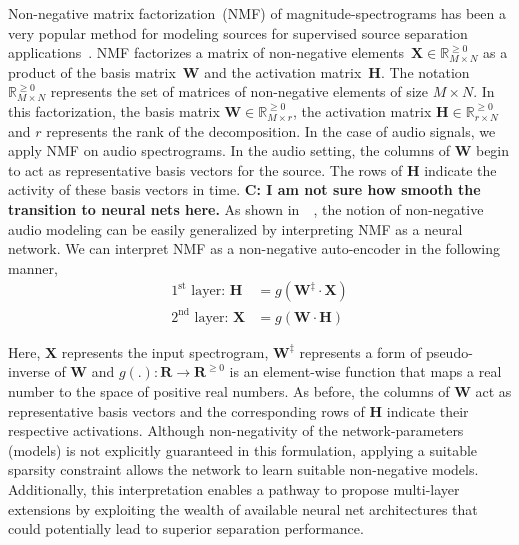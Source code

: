 \documentclass{article}
\begin{document}
Non-negative matrix factorization~(NMF) of magnitude-spectrograms has been a very popular method for modeling sources for supervised source separation applications~\cite{smaragdis2014static, virtanen2015compositional}. NMF factorizes a matrix of non-negative elements~$\mathbf{X}\in \mathbb{R}_{M\times N}^{\geq0}$ as a product of the basis matrix~$\mathbf{W}$ and the activation matrix~$\mathbf{H}$. The notation $\mathbb{R}_{M \times N}^{\geq0}$ represents the set of matrices of non-negative elements of size $M \times N$. In this factorization, the basis matrix $\mathbf{W} \in \mathbb{R}_{M \times r}^{\geq{0}}$, the activation matrix $\mathbf{H} \in \mathbb{R}_{r \times N}^{\geq{0}}$ and $r$ represents the rank of the decomposition. In the case of audio signals, we apply NMF on audio spectrograms. In the audio setting, the columns of $\mathbf{W}$ begin to act as representative basis vectors for the source. The rows of $\mathbf{H}$ indicate the activity of these basis vectors in time. \textbf{C: I am not sure how smooth the transition to neural nets here.} As shown in~~\cite{smaragdis2017aneural}, the notion of non-negative audio modeling can be easily generalized by interpreting NMF as a neural network. We can interpret NMF as a non-negative auto-encoder in the following manner,
\begin{align}
    \text{$1^{\text{st}}$ layer:~}\mathbf{H} &= g(\mathbf{W^{\ddagger}} \cdot \mathbf{X}) \nonumber \\
    \text{$2^{\text{nd}}$ layer:~}\mathbf{X} &= g(\mathbf{W} \cdot \mathbf{H})
    \label{eq:nmfae}
\end{align}

Here, $\mathbf{X}$ represents the input spectrogram, $\mathbf{W^{\ddagger}}$ represents a form of pseudo-inverse of $\mathbf{W}$ and $g(.):\mathbf{R}\rightarrow \mathbf{R}^{\geq0}$ is an element-wise function that maps a real number to the space of positive real numbers. As before, the columns of $\mathbf{W}$ act as representative basis vectors and the corresponding rows of $\mathbf{H}$ indicate their respective activations. Although non-negativity of the network-parameters (models) is not explicitly guaranteed in this formulation, applying a suitable sparsity constraint allows the network to learn suitable non-negative models. Additionally, this interpretation enables a pathway to propose multi-layer extensions by exploiting the wealth of available neural net architectures that could potentially lead to superior separation performance. \\
\end{document}

